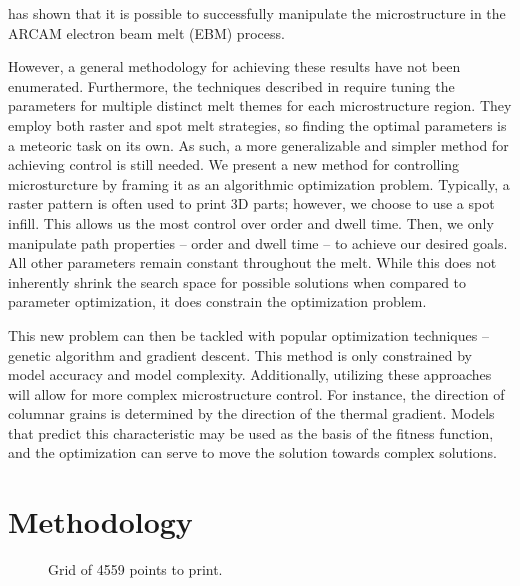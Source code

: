 \documentclass[a4paper]{article}
\begin{document}
\cite{dehoff2015site} has shown that it is possible to successfully manipulate the microstructure in the ARCAM electron beam melt (EBM) process. 

However, a general methodology for achieving these results have not been enumerated. Furthermore, the techniques described in \cite{dehoff2015site} require tuning the parameters for multiple distinct melt themes for each microstructure region. They employ both raster and spot melt strategies, so finding the optimal parameters is a meteoric task on its own. As such, a more generalizable and simpler method for achieving control is still needed. We present a new method for controlling microsturcture by framing it as an algorithmic optimization problem. Typically, a raster pattern is often used to print 3D parts; however, we choose to use a spot infill. This allows us the most control over order and dwell time. Then, we only manipulate path properties – order and dwell time – to achieve our desired goals. All other parameters remain constant throughout the melt. While this does not inherently shrink the search space for possible solutions when compared to parameter optimization, it does constrain the optimization problem. 

This new problem can then be tackled with popular optimization techniques – genetic algorithm and gradient descent. This method is only constrained by model accuracy and model complexity. Additionally, utilizing these approaches will allow for more complex microstructure control. For instance, the direction of columnar grains is determined by the direction of the thermal gradient. Models that predict this characteristic may be used as the basis of the fitness function, and the optimization can serve to move the solution towards complex solutions. 


\section{Methodology}
\label{sec:methodology}

\begin{figure}
\centering
{}
\caption{\label{fig:grid}Grid of 4559 points to print.}
\end{figure}
\end{document}
